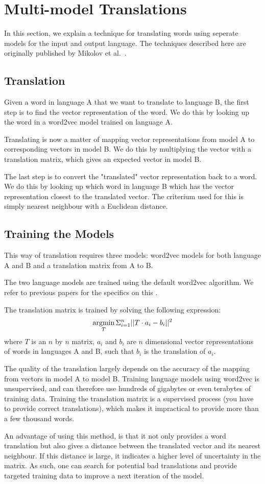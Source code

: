 \section{Multi-model Translations}
\label{sec:multi-model-translations}
In this section, we explain a technique for translating words using seperate models for the input and output language. The techniques described here are originally published by Mikolov et al.~\cite{mikolov2013exploiting}.

\subsection{Translation}
Given a word in language A that we want to translate to language B, the first step is to find the vector representation of the word. We do this by looking up the word in a word2vec model trained on language A.

Translating is now a matter of mapping vector representations from model A to corresponding vectors in model B. We do this by multiplying the vector with a translation matrix, which gives an expected vector in model B.

The last step is to convert the "translated" vector representation back to a word. We do this by looking up which word in language B which has the vector representation closest to the translated vector. The criterium used for this is simply nearest neighbour with a Euclidean distance.

\subsection{Training the Models}
This way of translation requires three models: word2vec models for both language A and B and a translation matrix from A to B.

The two language models are trained using the default word2vec algorithm. We refer to previous papers for the specifics on this \cite{mikolov2013efficient, mikolov2013distributed}.

The translation matrix is trained by solving the following expression:
$$ \argmin_{T} \Sigma_{i=1}^{n} || T \cdot a_i - b_i || ^{2}$$
where $T$ is an $n$ by $n$ matrix, $a_i$ and $b_i$ are $n$ dimensional vector representations of words in languages A and B, such that $b_i$ is the translation of $a_i$.

The quality of the translation largely depends on the accuracy of the mapping from vectors in model A to model B. Training language models using word2vec is unsupervised, and can therefore use hundreds of gigabytes or even terabytes of training data. Training the translation matrix is a supervised process (you have to provide correct translations), which makes it impractical to provide more than a few thousand words.

An advantage of using this method, is that it not only provides a word translation but also gives a distance between the translated vector and its nearest neighbour. If this distance is large, it indicates a higher level of uncertainty in the matrix. As such, one can search for potential bad translations and provide targeted training data to improve a next iteration of the model.